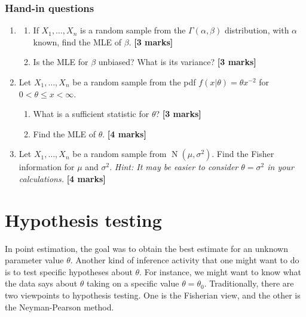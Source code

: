 \documentclass[
]{book}
\DeclareMathOperator{\N}{N}
\theoremstyle{definition}
\theoremstyle{definition}
\theoremstyle{definition}
\theoremstyle{definition}
\theoremstyle{remark}
\begin{document}
\hypertarget{hand-in-questions-3}{%
\subsection*{Hand-in questions}\label{hand-in-questions-3}}

\begin{enumerate}
\def\labelenumi{\arabic{enumi}.}
\item
  \begin{enumerate}
  \def\labelenumii{(\alph{enumii})}
  \item
    If \(X_1,\dots,X_n\) is a random sample from the \(\Gamma(\alpha,\beta)\) distribution, with \(\alpha\) known, find the MLE of \(\beta\). \textbf{{[}3 marks{]}}
  \item
    Is the MLE for \(\beta\) unbiased? What is its variance? \textbf{{[}3 marks{]}}
  \end{enumerate}
\item
  Let \(X_1,\dots,X_n\) be a random sample from the pdf \(f(x|\theta)=\theta x^{-2}\) for \(0 < \theta \leq x < \infty\).

  \begin{enumerate}
  \def\labelenumii{(\alph{enumii})}
  \item
    What is a sufficient statistic for \(\theta\)? \textbf{{[}3 marks{]}}
  \item
    Find the MLE of \(\theta\). \textbf{{[}4 marks{]}}
  \end{enumerate}
\item
  Let \(X_1,\dots,X_n\) be a random sample from \(\N(\mu,\sigma^2)\). Find the Fisher information for \(\mu\) and \(\sigma^2\). \emph{Hint: It may be easier to consider \(\theta=\sigma^2\) in your calculations.} \textbf{{[}4 marks{]}}
\end{enumerate}

\hypertarget{hypothesis-testing}{%
\chapter{Hypothesis testing}\label{hypothesis-testing}}

In point estimation, the goal was to obtain the best estimate for an unknown parameter value \(\theta\).
Another kind of inference activity that one might want to do is to test specific hypotheses about \(\theta\).
For instance, we might want to know what the data says about \(\theta\) taking on a specific value \(\theta=\theta_0\).
Traditionally, there are two viewpoints to hypothesis testing.
One is the Fisherian view, and the other is the Neyman-Pearson method.
\end{document}
